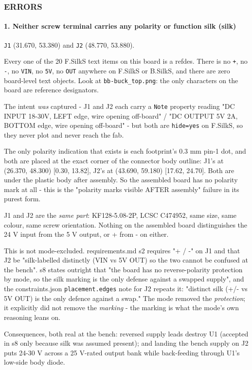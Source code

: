 \documentclass[11pt,a4paper]{article}
\begin{document}
\subsubsection*{ERRORS}
\paragraph*{1. Neither screw terminal carries any polarity or function silk (silk)}
\texttt{J1} (31.670, 53.380) and \texttt{J2} (48.770, 53.880).

Every one of the 20 F.SilkS text items on this board is a refdes. There is no \texttt{+}, no \texttt{-}, no \texttt{VIN}, no \texttt{5V}, no \texttt{OUT} anywhere on F.SilkS or B.SilkS, and there are zero board-level text objects. Look at \texttt{bb-buck\_top.png}: the only characters on the board are reference designators.

The intent \emph{was} captured - J1 and J2 each carry a \texttt{Note} property reading "DC INPUT 18-30V, LEFT edge, wire opening off-board" / "DC OUTPUT 5V 2A, BOTTOM edge, wire opening off-board" - but both are \texttt{hide=yes} on F.SilkS, so they never plot and never reach the fab.

The only polarity indication that exists is each footprint's 0.3 mm pin-1 dot, and both are placed at the exact corner of the connector body outline: J1's at (26.370, 48.300) {[}0.30, 13.82{]}, J2's at (43.690, 59.180) {[}17.62, 24.70{]}. Both are under the plastic body after assembly. So the assembled board has no polarity mark at all - this is the "polarity marks visible AFTER assembly" failure in its purest form.

J1 and J2 are the \emph{same part}: KF128-5.08-2P, LCSC C474952, same size, same colour, same screw orientation. Nothing on the assembled board distinguishes the 24 V input from the 5 V output, or + from - on either.

This is not mode-excluded. requirements.md s2 requires "+ / -" on J1 and that J2 be "silk-labelled distinctly (VIN vs 5V OUT) so the two cannot be confused at the bench". s8 states outright that "the board has no reverse-polarity protection by mode, so the silk marking is the only defense against a swapped supply", and the constraints.json \texttt{placement.edges} note for J2 repeats it: "distinct silk (+/- vs 5V OUT) is the only defence against a swap." The mode removed the \emph{protection}; it explicitly did not remove the \emph{marking} - the marking is what the mode's own reasoning leans on.

Consequences, both real at the bench: reversed supply leads destroy U1 (accepted in s8 only because silk was assumed present); and landing the bench supply on J2 puts 24-30 V across a 25 V-rated output bank while back-feeding through U1's low-side body diode.
\end{document}

